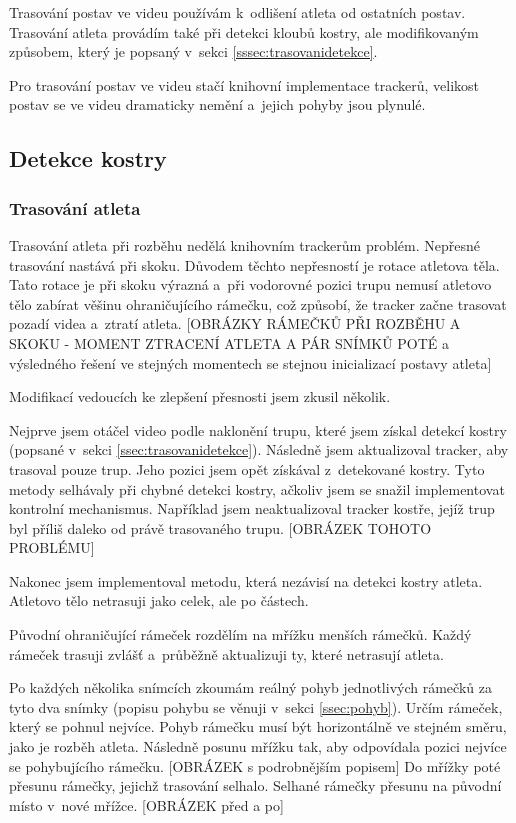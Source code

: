 Trasování postav ve videu používám k~odlišení atleta od ostatních postav. Trasování atleta provádím také při detekci kloubů kostry, ale modifikovaným způsobem, který je popsaný v~sekci \ref{sssec:trasovanidetekce}.

Pro trasování postav ve videu stačí knihovní implementace trackerů, velikost postav se ve videu dramaticky nemění a~jejich pohyby jsou plynulé.

\subsection{Detekce kostry}

\subsubsection{Trasování atleta}

Trasování atleta při rozběhu nedělá knihovním trackerům problém. Nepřesné trasování nastává při skoku. Důvodem těchto nepřesností je rotace atletova těla. Tato rotace je při skoku výrazná a~při vodorovné pozici trupu nemusí atletovo tělo zabírat věšinu ohraničujícího rámečku, což způsobí, že tracker začne trasovat pozadí videa a~ztratí atleta. [OBRÁZKY RÁMEČKŮ PŘI ROZBĚHU A SKOKU - MOMENT ZTRACENÍ ATLETA A PÁR SNÍMKŮ POTÉ a výsledného řešení ve stejných momentech se stejnou inicializací postavy atleta]

Modifikací vedoucích ke zlepšení přesnosti jsem zkusil několik.

Nejprve jsem otáčel video podle naklonění trupu, které jsem získal detekcí kostry (popsané v~sekci \ref{ssec:trasovanidetekce}). Následně jsem aktualizoval tracker, aby trasoval pouze trup. Jeho pozici jsem opět získával z~detekované kostry. Tyto metody selhávaly při chybné detekci kostry, ačkoliv jsem se snažil implementovat kontrolní mechanismus. Například jsem neaktualizoval tracker kostře, jejíž trup byl příliš daleko od právě trasovaného trupu. [OBRÁZEK TOHOTO PROBLÉMU]

Nakonec jsem implementoval metodu, která nezávisí na detekci kostry atleta. Atletovo tělo netrasuji jako celek, ale po částech.

Původní ohraničující rámeček rozdělím na mřížku menších rámečků. Každý rámeček trasuji zvlášť a~průběžně aktualizuji ty, které netrasují atleta.

Po každých několika snímcích zkoumám reálný pohyb jednotlivých rámečků za tyto dva snímky (popisu pohybu se věnuji v~sekci \ref{ssec:pohyb}). Určím rámeček, který se pohnul nejvíce. Pohyb rámečku musí být horizontálně ve stejném směru, jako je rozběh atleta. Následně posunu mřížku tak, aby odpovídala pozici nejvíce se pohybujícího rámečku. [OBRÁZEK s podrobnějším popisem] Do mřížky poté přesunu rámečky, jejichž trasování selhalo. Selhané rámečky přesunu na původní místo v~nové mřížce. [OBRÁZEK před a po]

